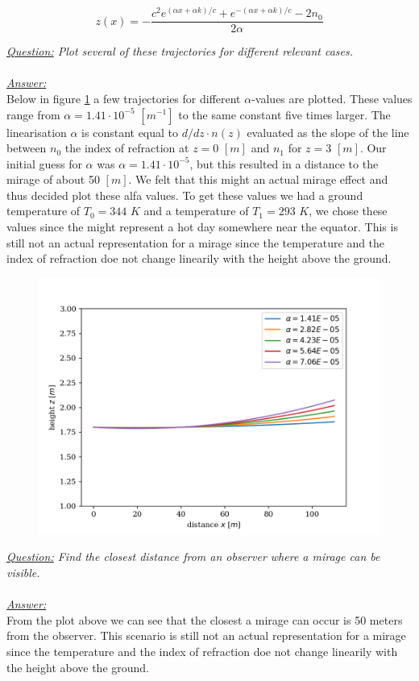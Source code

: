 \documentclass{article}
\begin{document}
\begin{equation}
	z(x)=-\frac{c^2 e^{(\alpha x + \alpha k)/c}+e^{-(\alpha x + \alpha k)/c}-2n_0}{2 \alpha}
	\label{eq:magic_wolfram}
\end{equation}

\textit{\underline{Question:} Plot several of these trajectories for different relevant cases.}\\
\\
\textit{\underline{Answer:}} \\
Below in figure \ref{fig:paths} a few trajectories for different $\alpha$-values are plotted. These values range from $\alpha = 1.41 \cdot 10^{-5}$ $[m^{-1}]$ to the same constant five times larger. The linearisation $\alpha$ is constant equal to $d/dz \cdot n(z)$ evaluated as the slope of the line between $n_0$ the index of refraction at $z=0$ $[m]$ and $n_1$ for $z=3$ $[m]$. Our initial guess for $\alpha$ was $\alpha = 1.41 \cdot 10^{-5}$, but this resulted in a distance to the mirage of about 50 $[m]$. We felt that this might an actual mirage effect and thus decided plot these alfa values. To get these values we had a ground temperature of $T_0 = 344$ $K$ and a temperature of $T_1 = 293$ $K$, we chose these values since the might represent a hot day somewhere near the equator. This is still not an actual representation for a mirage since the temperature and the index of refraction doe not change linearily with the height above the ground.\\

\begin{figure}[h!]
	\centering
	\includegraphics[width=0.5\linewidth,keepaspectratio]{afbeeldingen/light path.png}
	\label{fig:paths}
\end{figure}
\textit{\underline{Question:} Find the closest distance from an observer where a mirage can be visible.}\\
\\
\textit{\underline{Answer:}} \\
From the plot above we can see that the closest a mirage can occur is 50 meters from the observer. This scenario is still not an actual representation for a mirage since the temperature and the index of refraction doe not change linearily with the height above the ground.
\end{document}
